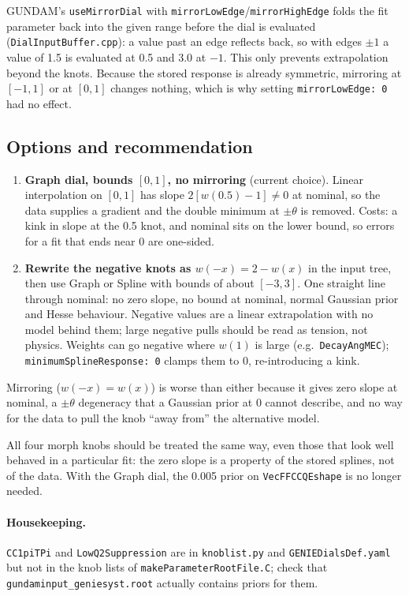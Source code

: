 \documentclass[11pt]{article}
\newcommand{\code}[1]{\texttt{#1}}
\begin{document}
GUNDAM's \code{useMirrorDial} with \code{mirrorLowEdge}/\code{mirrorHighEdge}
folds the fit parameter back into the given range before the dial is evaluated
(\code{DialInputBuffer.cpp}): a value past an edge reflects back, so with edges
$\pm1$ a value of 1.5 is evaluated at 0.5 and 3.0 at $-1$. This only prevents
extrapolation beyond the knots. Because the stored response is already
symmetric, mirroring at $[-1,1]$ or at $[0,1]$ changes nothing, which is why
setting \code{mirrorLowEdge: 0} had no effect.

\subsection{Options and recommendation}

\begin{enumerate}
  \item \textbf{Graph dial, bounds $[0,1]$, no mirroring} (current choice).
    Linear interpolation on $[0,1]$ has slope $2[w(0.5)-1]\neq0$ at nominal, so the
    data supplies a gradient and the double minimum at $\pm\theta$ is removed.
    Costs: a kink in slope at the 0.5 knot, and nominal sits on the lower
    bound, so errors for a fit that ends near 0 are one-sided.
  \item \textbf{Rewrite the negative knots as $w(-x)=2-w(x)$} in the input tree,
    then use Graph or Spline with bounds of about $[-3,3]$. One straight line
    through nominal: no zero slope, no bound at nominal, normal Gaussian prior
    and Hesse behaviour. Negative values are a linear extrapolation with no
    model behind them; large negative pulls should be read as tension, not
    physics. Weights can go negative where $w(1)$ is large (e.g.\
    \code{DecayAngMEC}); \code{minimumSplineResponse: 0} clamps them to 0,
    re-introducing a kink.
\end{enumerate}
Mirroring ($w(-x)=w(x)$) is worse than either because it gives zero slope at
nominal, a $\pm\theta$ degeneracy that a Gaussian prior at 0 cannot describe, and
no way for the data to pull the knob ``away from'' the alternative model.

All four morph knobs should be treated the same way, even those that look well
behaved in a particular fit: the zero slope is a property of the stored
splines, not of the data. With the Graph dial, the 0.005 prior on
\code{VecFFCCQEshape} is no longer needed.

\paragraph{Housekeeping.} \code{CC1piTPi} and \code{LowQ2Suppression} are in
\code{knoblist.py} and \code{GENIEDialsDef.yaml} but not in the knob lists of
\code{makeParameterRootFile.C}; check that \code{gundaminput\_geniesyst.root}
actually contains priors for them.
\end{document}
